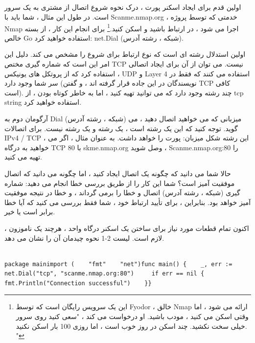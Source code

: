 \documentclass[12pt]{book}
\begin{document}
\subsection{}
اولین قدم برای ایجاد اسکنر پورت ، درک نحوه شروع اتصال از مشتری به یک سرور است. در طول این مثال ، شما باید با Scanme.nmap.org ، خدمتی که توسط پروژه Nmap اجرا می شود ، در ارتباط باشید و اسکن کنید.\footnote{این یک سرویس رایگان است که توسط Fyodor ، خالق Nmap ارائه می شود ، اما وقتی اسکن می کنید ، مودب باشید. او درخواست می کند ، "سعی کنید روی سرور خیلی سخت نکشید. چند اسکن در روز خوب است ، اما روزی 100 بار اسکن نکنید. "}
برای انجام این کار ، از بسته خالص Go استفاده خواهید کرد: net.Dial (شبکه ، رشته آدرس).

اولین استدلال رشته ای است که نوع ارتباط برای شروع را مشخص می کند. دلیل این امر این است که شماره گیری مختص TCP نیست. می توان از آن برای ایجاد اتصالی استفاده کرد که از پروتکل های یونیکس ، UDP و Layer 4 استفاده می کنند که فقط در سر شما وجود دارد (نویسندگان در این جاده قرار گرفته اند ، و گفتن TCP کافی است). چند رشته وجود دارد که می توانید تهیه کنید ، اما به خاطر کوتاه بودن ، از tcp string استفاده خواهید کرد.

آرگومان دوم به Dial (شبکه ، رشته آدرس) میزبانی که می خواهید اتصال دهید ، می گوید. توجه کنید که این یک رشته است ، یک رشته و یک رشته نیست. برای اتصالات IPv4 / TCP ، این رشته شکل میزبان: پورت را خواهد داشت. به عنوان مثال ، اگر می خواهید به درگاه TCP 80 با skme.nmap.org وصل شوید ، Scanme.nmap.org:80 را تهیه می کنید.

حالا شما می دانید که چگونه یک اتصال ایجاد کنید ، اما چگونه می دانید که اتصال موفقیت آمیز است؟ شما این کار را از طریق بررسی خطا انجام می دهید: شماره گیری (شبکه ، رشته آدرس) اتصال و خطا را برمی گرداند ، و خطا در نتیجه موفقیت آمیز خواهد بود. بنابراین ، برای تأیید ارتباط خود ، شما فقط بررسی می کنید که آیا خطا برابر است یا خیر.

اکنون تمام قطعات مورد نیاز برای ساختن یک اسکنر درگاه واحد ، هرچند یک ناموزون ، لازم است. لیست 2-1 نحوه چیدمان آن را نشان می دهد.
\begin{latin}
	\begin{lstlisting}[caption={ A basic port scanner that scans only one port (https://github.com/blackhat-go/bhg/blob/master/ch-2/dial/main.go/},captionpos=b]

package mainimport (    "fmt"    "net")func main() {    _, err := net.Dial("tcp", "scanme.nmap.org:80")     if err == nil {
fmt.Println("Connection successful")    }}
	\end{lstlisting}
\end{latin}
\end{document}
